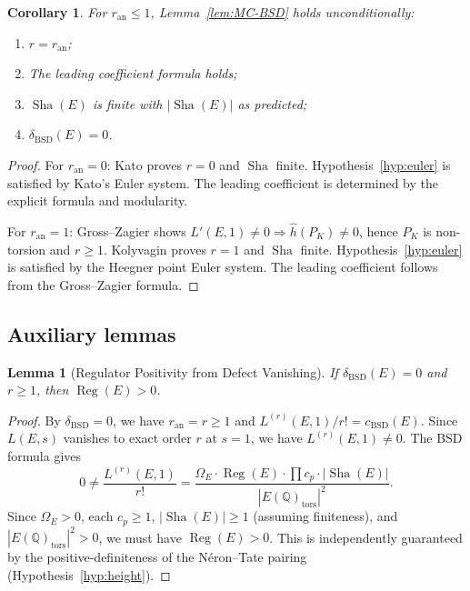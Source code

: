 \documentclass[11pt]{article}
\newtheorem{lemma}[theorem]{Lemma}
\newtheorem{corollary}[theorem]{Corollary}
\DeclareMathOperator{\Reg}{Reg}
\DeclareMathOperator{\Sha}{Sha}
\begin{document}
\begin{corollary}
\label{cor:low-rank}
For $r_{\mathrm{an}} \leq 1$, Lemma~\ref{lem:MC-BSD} holds unconditionally:
\begin{enumerate}
  \item $r = r_{\mathrm{an}}$;
  \item The leading coefficient formula holds;
  \item $\Sha(E)$ is finite with $|\Sha(E)|$ as predicted;
  \item $\delta_{\mathrm{BSD}}(E) = 0$.
\end{enumerate}
\end{corollary}

\begin{proof}
For $r_{\mathrm{an}} = 0$: Kato \cite{Kato} proves $r = 0$ and $\Sha$ finite.
Hypothesis~\ref{hyp:euler} is satisfied by Kato's Euler system.  The leading
coefficient is determined by the explicit formula and modularity.

For $r_{\mathrm{an}} = 1$: Gross--Zagier \cite{GZ} shows $L'(E,1) \neq 0
\Rightarrow \hat{h}(P_K) \neq 0$, hence $P_K$ is non-torsion and $r \geq 1$.
Kolyvagin \cite{Koly} proves $r = 1$ and $\Sha$ finite.
Hypothesis~\ref{hyp:euler} is satisfied by the Heegner point Euler system.
The leading coefficient follows from the Gross--Zagier formula.
\end{proof}

\subsection{Auxiliary lemmas}

\begin{lemma}[Regulator Positivity from Defect Vanishing]
\label{lem:reg-positive}
If $\delta_{\mathrm{BSD}}(E) = 0$ and $r \geq 1$, then $\Reg(E) > 0$.
\end{lemma}

\begin{proof}
By $\delta_{\mathrm{BSD}} = 0$, we have $r_{\mathrm{an}} = r \geq 1$ and
$L^{(r)}(E,1)/r! = c_{\mathrm{BSD}}(E)$.  Since $L(E,s)$ vanishes to exact
order $r$ at $s = 1$, we have $L^{(r)}(E,1) \neq 0$.  The BSD formula gives
\[
  0 \neq \frac{L^{(r)}(E,1)}{r!} =
  \frac{\Omega_E \cdot \Reg(E) \cdot \prod c_p \cdot |\Sha(E)|}
       {|E(\mathbb{Q})_{\mathrm{tors}}|^2}.
\]
Since $\Omega_E > 0$, each $c_p \geq 1$, $|\Sha(E)| \geq 1$ (assuming
finiteness), and $|E(\mathbb{Q})_{\mathrm{tors}}|^2 > 0$, we must have
$\Reg(E) > 0$.  This is independently guaranteed by the positive-definiteness
of the N\'eron--Tate pairing (Hypothesis~\ref{hyp:height}).
\end{proof}
\end{document}
